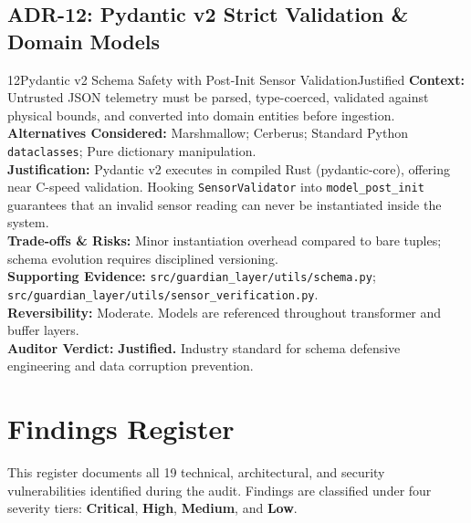 \documentclass[10pt,a4paper]{report}
\begin{document}
\section{ADR-12: Pydantic v2 Strict Validation \& Domain Models}
\begin{adrbox}{12}{Pydantic v2 Schema Safety with Post-Init Sensor Validation}{Justified}
\textbf{Context:} Untrusted JSON telemetry must be parsed, type-coerced, validated against physical bounds, and converted into domain entities before ingestion.\\
\textbf{Alternatives Considered:} Marshmallow; Cerberus; Standard Python \texttt{dataclasses}; Pure dictionary manipulation.\\
\textbf{Justification:} Pydantic v2 executes in compiled Rust (pydantic-core), offering near C-speed validation. Hooking \texttt{SensorValidator} into \texttt{model\_post\_init} guarantees that an invalid sensor reading can never be instantiated inside the system.\\
\textbf{Trade-offs \& Risks:} Minor instantiation overhead compared to bare tuples; schema evolution requires disciplined versioning.\\
\textbf{Supporting Evidence:} \texttt{src/guardian\_layer/utils/schema.py}; \texttt{src/guardian\_layer/utils/sensor\_verification.py}.\\
\textbf{Reversibility:} Moderate. Models are referenced throughout transformer and buffer layers.\\
\textbf{Auditor Verdict:} \textbf{Justified.} Industry standard for schema defensive engineering and data corruption prevention.
\end{adrbox}

\chapter{Findings Register}

This register documents all 19 technical, architectural, and security vulnerabilities identified during the audit. Findings are classified under four severity tiers: \textbf{Critical}, \textbf{High}, \textbf{Medium}, and \textbf{Low}.
\end{document}

